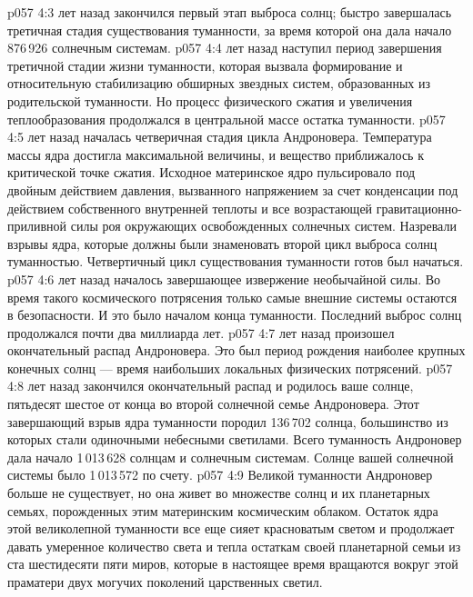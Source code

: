 \vs p057 4:3 \pc {} лет назад закончился первый этап выброса солнц; быстро завершалась третичная стадия существования туманности, за время которой она дала начало 876\,926 солнечным системам.
\vs p057 4:4 \pc {} лет назад наступил период завершения третичной стадии жизни туманности, которая вызвала формирование и относительную стабилизацию обширных звездных систем, образованных из родительской туманности. Но процесс физического сжатия и увеличения теплообразования продолжался в центральной массе остатка туманности.
\vs p057 4:5 \pc {} лет назад началась четверичная стадия цикла Андроновера. Температура массы ядра достигла максимальной величины, и вещество приближалось к критической точке сжатия. Исходное материнское ядро пульсировало под двойным действием давления, вызванного напряжением за счет конденсации под действием собственного внутренней теплоты и все возрастающей гравитационно\hyp{}приливной силы роя окружающих освобожденных солнечных систем. Назревали взрывы ядра, которые должны были знаменовать второй цикл выброса солнц туманностью. Четвертичный цикл существования туманности готов был начаться.
\vs p057 4:6 \pc {} лет назад началось завершающее извержение необычайной силы. Во время такого космического потрясения только самые внешние системы остаются в безопасности. И это было началом конца туманности. Последний выброс солнц продолжался почти два миллиарда лет.
\vs p057 4:7 \pc {} лет назад произошел окончательный распад Андроновера. Это был период рождения наиболее крупных конечных солнц --- время наибольших локальных физических потрясений.
\vs p057 4:8 \pc {} лет назад закончился окончательный распад и родилось ваше солнце, пятьдесят шестое от конца во второй солнечной семье Андроновера. Этот завершающий взрыв ядра туманности породил 136\,702 солнца, большинство из которых стали одиночными небесными светилами. Всего туманность Андроновер дала начало 1\,013\,628 солнцам и солнечным системам. Солнце вашей солнечной системы было 1\,013\,572 по счету.
\vs p057 4:9 Великой туманности Андроновер больше не существует, но она живет во множестве солнц и их планетарных семьях, порожденных этим материнским космическим облаком. Остаток ядра этой великолепной туманности все еще сияет красноватым светом и продолжает давать умеренное количество света и тепла остаткам своей планетарной семьи из ста шестидесяти пяти миров, которые в настоящее время вращаются вокруг этой праматери двух могучих поколений царственных светил.
